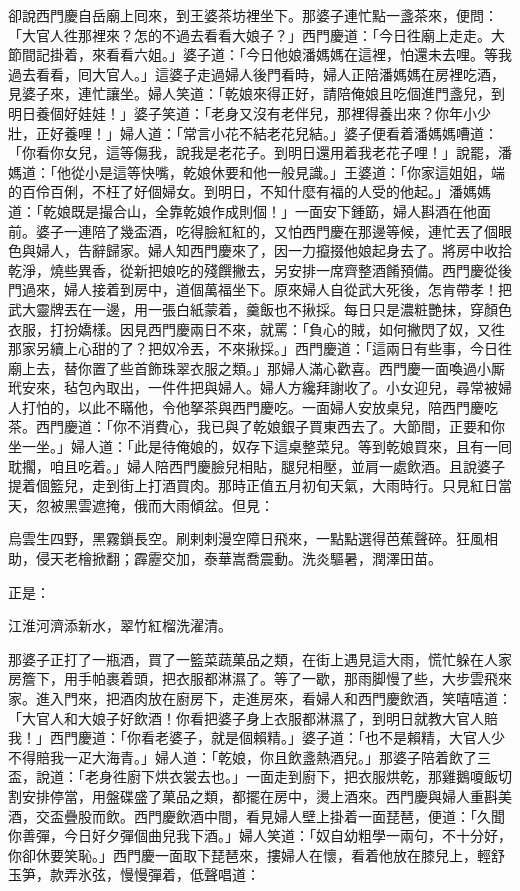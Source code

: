 卻說西門慶自岳廟上囘來，到王婆茶坊裡坐下。那婆子連忙點一盞茶來，便問：「大官人徃那裡來？怎的不過去看看大娘子？」西門慶道：「今日徃廟上走走。大節間記掛着，來看看六姐。」婆子道：「今日他娘潘媽媽在這裡，怕還未去哩。等我過去看看，囘大官人。」這婆子走過婦人後門看時，婦人正陪潘媽媽在房裡吃酒，見婆子來，連忙讓坐。婦人笑道：「乾娘來得正好，請陪俺娘且吃個進門盞兒，到明日養個好娃娃！」婆子笑道：「老身又沒有老伴兒，那裡得養出來？你年小少壯，正好養哩！」婦人道：「常言小花不結老花兒結。」婆子便看着潘媽媽嘈道：「你看你女兒，這等傷我，說我是老花子。到明日還用着我老花子哩！」{}說罷，潘媽道：「他從小是這等快嘴，乾娘休要和他一般見識。」王婆道：「你家這姐姐，端的百伶百俐，不枉了好個婦女。到明日，不知什麼有福的人受的他起。」潘媽媽道：「乾娘既是撮合山，全靠乾娘作成則個！」一面安下鍾筯，婦人斟酒在他面前。婆子一連陪了幾盃酒，吃得臉紅紅的，又怕西門慶在那邊等候，連忙丟了個眼色與婦人，告辭歸家。婦人知西門慶來了，因一力攛掇他娘起身去了。將房中收拾乾淨，燒些異香，從新把娘吃的殘饌撇去，另安排一席齊整酒餚預備。西門慶從後門過來，婦人接着到房中，道個萬福坐下。原來婦人自從武大死後，怎肯帶孝！把武大靈牌丟在一邊，{}用一張白紙蒙着，羹飯也不揪採。每日只是濃粧艷抹，穿顏色衣服，打扮嬌樣。因見西門慶兩日不來，就罵：「負心的賊，如何撇閃了奴，又徃那家另續上心甜的了？把奴冷丟，不來揪採。」西門慶道：「這兩日有些事，今日徃廟上去，替你置了些首飾珠翠衣服之類。」那婦人滿心歡喜。西門慶一面喚過小厮玳安來，毡包內取出，一件件把與婦人。婦人方纔拜謝收了。小女迎兒，尋常被婦人打怕的，以此不瞞他，令他拏茶與西門慶吃。一面婦人安放桌兒，陪西門慶吃茶。西門慶道：「你不消費心，我已與了乾娘銀子買東西去了。大節間，正要和你坐一坐。」婦人道：「此是待俺娘的，奴存下這桌整菜兒。等到乾娘買來，且有一囘耽擱，咱且吃着。」婦人陪西門慶臉兒相貼，腿兒相壓，並肩一處飲酒。且說婆子提着個籃兒，走到街上打酒買肉。那時正值五月初旬天氣，大雨時行。只見紅日當天，忽被黑雲遮掩，俄而大雨傾盆。但見：

烏雲生四野，黑霧鎖長空。刷剌剌漫空障日飛來，一點點選得芭蕉聲碎。狂風相助，侵天老檜掀翻；霹靂交加，泰華嵩喬震動。洗炎驅暑，潤澤田苗。

正是：

江淮河濟添新水，翠竹紅榴洗濯清。

那婆子正打了一瓶酒，買了一籃菜蔬菓品之類，在街上遇見這大雨，慌忙躲在人家房簷下，用手帕裹着頭，把衣服都淋濕了。等了一歇，那雨脚慢了些，大步雲飛來家。進入門來，把酒肉放在廚房下，走進房來，看婦人和西門慶飲酒，笑嘻嘻道：「大官人和大娘子好飲酒！你看把婆子身上衣服都淋濕了，到明日就教大官人賠我！」西門慶道：「你看老婆子，就是個賴精。」婆子道：「也不是賴精，大官人少不得賠我一疋大海青。」婦人道：「乾娘，你且飲盞熱酒兒。」那婆子陪着飲了三盃，說道：「老身徃廚下烘衣裳去也。」一面走到廚下，把衣服烘乾，那雞鵝嗄飯切割安排停當，用盤碟盛了菓品之類，都擺在房中，燙上酒來。西門慶與婦人重斟美酒，交盃疊股而飲。西門慶飲酒中間，看見婦人壁上掛着一面琵琶，便道：「久聞你善彈，今日好夕彈個曲兒我下酒。」婦人笑道：「奴自幼粗學一兩句，不十分好，你卻休要笑恥。」西門慶一面取下琵琶來，摟婦人在懷，看着他放在膝兒上，輕舒玉笋，款弄氷弦，慢慢彈着，低聲唱道：

